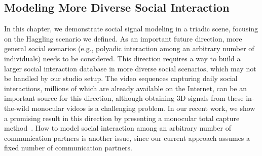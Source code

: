 \subsection{Modeling More Diverse Social Interaction}
In this chapter, we demonstrate social signal modeling in a triadic scene, focusing on the Haggling scenario we defined. As an important future direction, more general social scenarios (e.g., polyadic interaction among an arbitrary number of individuals) needs to be considered. This direction requires a way to build a larger social interaction database in more diverse social scenarios, which may not be handled by our studio setup. The video sequences capturing daily social interactions, millions of which are already available on the Internet, can be an important source for this direction, although obtaining 3D signals from these in-the-wild monocular videos is a challenging problem. In our recent work, we show a promising result in this direction by presenting a monocular total capture method~\cite{Xiang2019}. How to model social interaction among an arbitrary number of communication partners is another issue, since our current approach assumes a fixed number of communication partners. 

%
%


